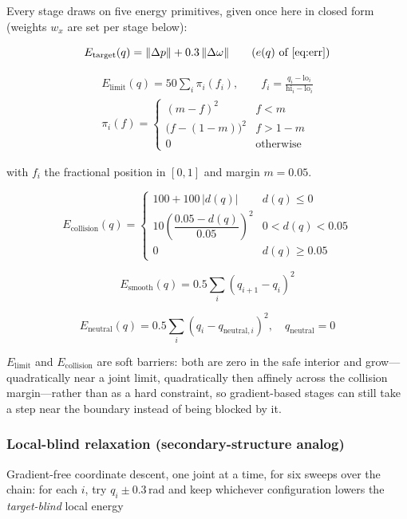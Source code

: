 \documentclass[10pt,conference]{IEEEtran}
\newcommand{\Etgt}{E_{\mathrm{target}}}
\newcommand{\Elim}{E_{\mathrm{limit}}}
\newcommand{\Ecol}{E_{\mathrm{collision}}}
\newcommand{\Esmo}{E_{\mathrm{smooth}}}
\newcommand{\Eneu}{E_{\mathrm{neutral}}}
\begin{document}
Every stage draws on five energy primitives, given once here in closed form
(weights $w_x$ are set per stage below):

\begin{equation}
\Etgt(q) = \|\Delta p\| + 0.3\,\|\Delta\omega\|
\qquad (e(q) \text{ of } \eqref{eq:err})
\label{eq:etarget}
\end{equation}

\begin{equation}
\begin{gathered}
\Elim(q) = 50 \sum_i \pi_i(f_i), \qquad
f_i = \frac{q_i - \mathrm{lo}_i}{\mathrm{hi}_i - \mathrm{lo}_i}\\[2pt]
\pi_i(f) =
\begin{cases}
(m - f)^2 & f < m\\
\big(f - (1-m)\big)^2 & f > 1-m\\
0 & \text{otherwise}
\end{cases}
\end{gathered}
\label{eq:elimit}
\end{equation}

with $f_i$ the fractional position in $[0,1]$ and margin $m = 0.05$.

\begin{equation}
\Ecol(q) =
\begin{cases}
100 + 100\,|d(q)| & d(q) \le 0\\[2pt]
10\left(\dfrac{0.05 - d(q)}{0.05}\right)^{2} & 0 < d(q) < 0.05\\[4pt]
0 & d(q) \ge 0.05
\end{cases}
\label{eq:ecoll}
\end{equation}

\begin{equation}
\Esmo(q) = 0.5 \sum_i (q_{i+1} - q_i)^2
\label{eq:esmooth}
\end{equation}

\begin{equation}
\Eneu(q) = 0.5 \sum_i (q_i - q_{\mathrm{neutral},i})^2,
\quad q_{\mathrm{neutral}} = 0
\label{eq:eneutral}
\end{equation}

$\Elim$ and $\Ecol$ are soft barriers: both are zero in the safe interior and
grow---quadratically near a joint limit, quadratically then affinely across the
collision margin---rather than as a hard constraint, so gradient-based stages can
still take a step near the boundary instead of being blocked by it.

\subsubsection{Local-blind relaxation (secondary-structure analog)}
Gradient-free coordinate descent, one joint at a time, for six sweeps over the
chain: for each $i$, try $q_i \pm 0.3$\,rad and keep whichever configuration
lowers the \emph{target-blind} local energy
\end{document}
